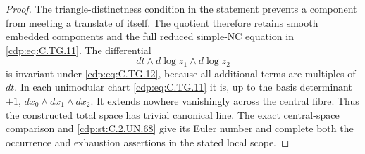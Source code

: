 \begin{proof}
The triangle-distinctness condition in
the statement prevents a component from
meeting a translate of itself. The
quotient therefore retains smooth embedded
components and the full reduced
simple-NC equation in \eqref{cdp:eq:C.TG.11}.
The differential
\[
                  dt\wedge d\log z_1\wedge d\log z_2
\tag{C.TG.15}\label{cdp:eq:C.TG.15}
\]
is invariant under \eqref{cdp:eq:C.TG.12}, because all
additional terms are multiples of $dt$.
In each unimodular chart \eqref{cdp:eq:C.TG.11} it is,
up to the basis determinant $\pm1$,
$dx_0\wedge dx_1\wedge dx_2$.
It extends nowhere vanishingly across
the central fibre. Thus the constructed
total space has trivial canonical line.
The exact central-space comparison and
\ref{cdp:st:C.2.UN.68} give its Euler number and complete
both the occurrence and exhaustion
assertions in the stated local scope.
\end{proof}


